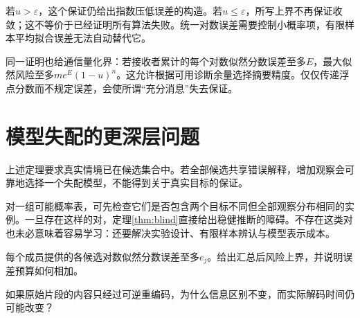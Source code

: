 若$u>\varepsilon$，这个保证仍给出指数压低误差的构造。若$u\le\varepsilon$，所写上界不再保证收敛；这不等价于已经证明所有算法失败。统一对数误差需要控制小概率项，有限样本平均拟合误差无法自动替代它。

同一证明也给通信量化界：若接收者累计的每个对数似然分数误差至多$E$，最大似然风险至多$me^E(1-u)^n$。这允许根据可用诊断余量选择摘要精度。仅仅传递浮点分数而不规定误差，会使所谓“充分消息”失去保证。

\section{模型失配的更深层问题}
上述定理要求真实情境已在候选集合中。若全部候选共享错误解释，增加观察会可靠地选择一个失配模型，不能得到关于真实目标的保证。

对一组可能概率表，可先检查它们是否包含两个目标不同但全部观察分布相同的实例。一旦存在这样的对，定理\ref{thm:blind}直接给出稳健推断的障碍。不存在这类对也未必意味着容易学习：还要解决实验设计、有限样本辨认与模型表示成本。

\begin{exercise}每个成员提供的各候选对数似然分数误差至多$e_j$。给出汇总后风险上界，并说明误差预算如何相加。\end{exercise}
\begin{exercise}如果原始片段的内容只经过可逆重编码，为什么信息区别不变，而实际解码时间仍可能改变？\end{exercise}
